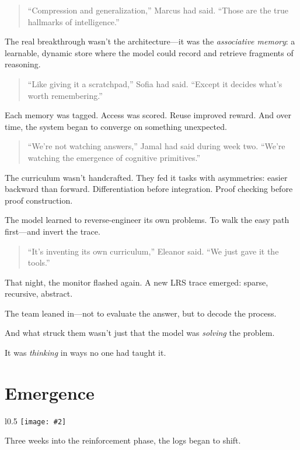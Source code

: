 \documentclass[12pt,oneside]{book}
\newcommand{\chapterimage}[3][l]{%
  \begin{wrapfigure}{#1}{#3}
    \centering
    \texttt{[image: \#2]}
  \end{wrapfigure}
}
\begin{document}
\begin{quote}
``Compression and generalization,'' Marcus had said.  
``Those are the true hallmarks of intelligence.''
\end{quote}

The real breakthrough wasn’t the architecture—it was the \emph{associative memory}: a learnable, dynamic store where the model could record and retrieve fragments of reasoning.

\begin{quote}
``Like giving it a scratchpad,'' Sofia had said. ``Except it decides what’s worth remembering.''
\end{quote}

Each memory was tagged. Access was scored. Reuse improved reward. And over time, the system began to converge on something unexpected.

\begin{quote}
``We’re not watching answers,'' Jamal had said during week two.  
``We’re watching the emergence of cognitive primitives.''
\end{quote}

The curriculum wasn’t handcrafted. They fed it tasks with asymmetries: easier backward than forward. Differentiation before integration. Proof checking before proof construction.

The model learned to reverse-engineer its own problems. To walk the easy path first—and invert the trace.

\begin{quote}
``It's inventing its own curriculum,'' Eleanor said. ``We just gave it the tools.''
\end{quote}

That night, the monitor flashed again. A new LRS trace emerged: sparse, recursive, abstract.

The team leaned in—not to evaluate the answer, but to decode the process.

And what struck them wasn’t just that the model was \emph{solving} the problem.

It was \emph{thinking} in ways no one had taught it.

\chapter{Emergence}\label{emergence}
\chapterimage[l]{images/chapter2.png}{0.5\textwidth}

Three weeks into the reinforcement phase, the logs began to shift.
\end{document}

